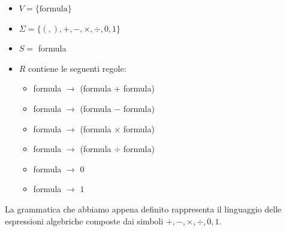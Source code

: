 \begin{itemize}
    \item $V = \{ \text{formula} \}$
    \item $\Sigma = \{ (,), +,-,\times,\div,0,1  \}$
    \item $S =$ formula
    \item $R$ contiene le seguenti regole:
    \begin{itemize}
        \item formula $\rightarrow$ (formula $+$ formula)
        \item formula $\rightarrow$ (formula $-$ formula)
        \item  formula $\rightarrow$ (formula $\times$ formula)
        \item  formula $\rightarrow$ (formula $\div$ formula)
        \item formula $\rightarrow$ $0$
        \item formula $\rightarrow$ $1$
    \end{itemize}
\end{itemize}

\noindent La grammatica che abbiamo appena definito rappresenta il linguaggio delle espressioni algebriche 
composte dai simboli $+,-,\times,\div,0,1$.



